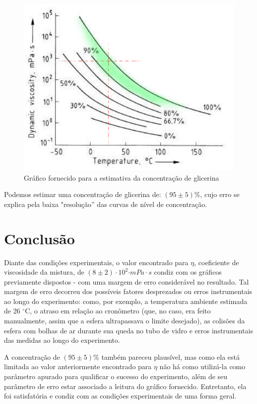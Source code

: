\documentclass[english,brazil]{article}
\begin{document}
			\begin{figure}[!ht]
				\centering
					\includegraphics[scale=0.3]{graf_png.png}
				\caption{Gráfico fornecido para a estimativa da concentração de glicerina}
			\end{figure}

			Podemos estimar uma concentração de glicerina de: $(95\pm5)\%$, cujo erro se explica pela baixa "resolução'' das curvas de nível de concentração.


	\section{Conclusão}

	
		Diante das condições experimentais, o valor encontrado para $\eta$,
		coeficiente de viscosidade da mistura, de $\left(8\pm2\right)\cdot10^{2}\unit{\cdot mPa\cdot s}$
		condiz com os gráficos previamente dispostos - com uma margem de erro
		considerável no resultado. Tal margem de erro decorreu dos possíveis
		fatores desprezados ou erros instrumentais ao longo do experimento:
		como, por exemplo, a temperatura ambiente estimada de 26 $^{\circ}$C,
		o atraso em relação ao cronômetro (que, no caso, era feito manualmente,
		assim que a esfera ultrapassava o limite desejado), as colisões da
		esfera com bolhas de ar durante sua queda no tubo de vidro e erros
		instrumentais das medidas ao longo do experimento.

		A concentração de $(95\pm5)\%$ também pareceu plausível, mas como
		ela está limitada ao valor anteriormente encontrado para $\eta$ não
		há como utilizá-la como parâmetro apurado para qualificar o sucesso
		do experimento, além de seu parâmetro de erro estar associado a leitura
		do gráfico fornecido. Entretanto, ela foi satisfatória e condiz com
		as condições experimentais de uma forma geral. 
	
\end{document}
